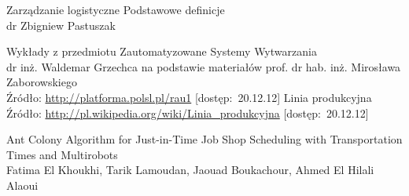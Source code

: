 \documentclass[twoside]{kInzynierka}
\begin{document}
\begin{thebibliography}{99}

Zarządzanie logistyczne Podstawowe definicje \\
dr Zbigniew Pastuszak

Wykłady z przedmiotu Zautomatyzowane Systemy Wytwarzania\\
dr inż. Waldemar Grzechca na podstawie materiałów prof. dr hab. inż. Mirosława Zaborowskiego \\
Źródło: \url{http://platforma.polsl.pl/rau1} [dostęp:~20.12.12]
Linia produkcyjna \\
Źródło: \url{http://pl.wikipedia.org/wiki/Linia_produkcyjna} [dostęp:~20.12.12]

    Ant Colony Algorithm for Just-in-Time Job Shop Scheduling with Transportation Times and Multirobots \\
    Fatima El Khoukhi, Tarik Lamoudan, Jaouad Boukachour, Ahmed El Hilali Alaoui




\end{thebibliography}
\end{document}
